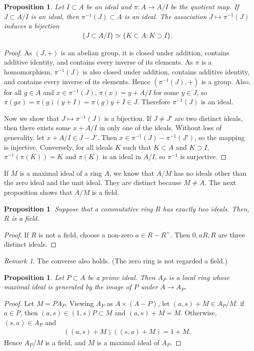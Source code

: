 \documentclass[12pt]{report}
\theoremstyle{plain}
\newtheorem{proposition}[theorem]{Proposition}
\theoremstyle{remark}
\newtheorem*{remark}{Remark}
\theoremstyle{definition}
\begin{document}
\begin{proposition}
    Let $I\subset A$ be an ideal and $\pi:A\rightarrow A/I$ be the quotient map. If $J\subset A/I$ is an ideal, then $\pi^{-1}(J)\subset A$ is an ideal. The association $J\mapsto \pi^{-1}(J)$ induces a bijection
    \begin{align*}
        \{J\subset A/I\}\simeq \{K\subset A:K\supset I\}.
    \end{align*}
\end{proposition}
\begin{proof}
    As $(J,+)$ is an abelian group, it is closed under addition, contains additive identity, and contains every inverse of its elements. As $\pi$ is a homomorphism, $\pi^{-1}(J)$ is also closed under addition, contains additive identity, and contains every inverse of its elements. Hence $(\pi^{-1}(J),+)$ is a group. Also, for all $g\in A$ and $x\in \pi^{-1}(J)$, $\pi(x)=y+A/I$ for some $y\in J$, so $\pi(gx)=\pi(g)(y+I) = \pi(g)y + I\in J$. Therefore $\pi^{-1}(J)$ is an ideal.

    Now we show that $J\mapsto \pi^{-1}(J)$ is a bijection. If $J\neq J'$ are two distinct ideals, then there exists some $x+A/I$ in only one of the ideals. Without loss of generality, let $x+A/I\in J-J'$. Then $x\in \pi^{-1}(J)-\pi^{-1}(J')$, so the mapping is injective. Conversely, for all ideals $K$ such that $K\subset A$ and $K\supset I$, $\pi^{-1}(\pi(K))=K$ and $\pi(K)$ is an ideal in $A/I$, so $\pi^{-1}$ is surjective.
\end{proof}

If $M$ is a maximal ideal of a ring $A$, we know that $A/M$ has no ideals other than the zero ideal and the unit ideal. They are distinct because $M\neq A$. The next proposition shows that $A/M$ is a field.

\begin{proposition}
    Suppose that a commutative ring $R$ has exactly two ideals. Then, $R$ is a field.
\end{proposition}
\begin{proof}
    If $R$ is not a field, choose a non-zero $a\in R-R^\times$. Then $0,aR,R$ are three distinct ideals.
\end{proof}
\begin{remark}
    The converse also holds. (The zero ring is not regarded a field.) 
\end{remark}

\begin{proposition}
    Let $P\subset A$ be a prime ideal. Then $A_P$ is a local ring whose maximal ideal is generated by the image of $P$ under $A\rightarrow A_P$.
\end{proposition}
\begin{proof}
    Let $M=PA_P$. Viewing $A_P$ as $A\times(A-P)$, let $(a,s)+M\in A_P/M$. if $a\in P$, then $(a,s)\in(1,s)P\subset M$ and $(a,s)+M=M$. Otherwise, $(s,a)\in A_P$ and
    \begin{align*}
        ((a,s)+M)((s,a)+M)=1+M.
    \end{align*}
    Hence $A_P/M$ is a field, and $M$ is a maximal ideal of $A_P$.
    \end{proof}
\end{document}
